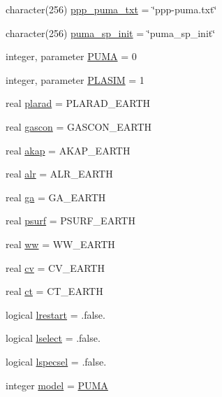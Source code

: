 \begin{DoxyCompactItemize}
\item 
character(256) \hyperlink{classpumamod_ae6491cb06d104f50f9803d15f195f951}{ppp\-\_\-puma\-\_\-txt} = \char`\"{}ppp-\/puma.\-txt\char`\"{}
\item 
character(256) \hyperlink{classpumamod_a97179af6f9ebee802a4333f951b0f436}{puma\-\_\-sp\-\_\-init} = \char`\"{}puma\-\_\-sp\-\_\-init\char`\"{}
\item 
integer, parameter \hyperlink{classpumamod_a6cfe02b5d7dfcb7850792dcc03ae3a45}{\-P\-U\-M\-A} = 0
\item 
integer, parameter \hyperlink{classpumamod_a6014a04a0c8a568ae850cff922ec8c36}{\-P\-L\-A\-S\-I\-M} = 1
\item 
real \hyperlink{classpumamod_a0c307462fbf87e3081b2a385e18d2aed}{plarad} = \-P\-L\-A\-R\-A\-D\-\_\-\-E\-A\-R\-T\-H
\item 
real \hyperlink{classpumamod_ae3f731196cc45fe58378593cedcbb674}{gascon} = \-G\-A\-S\-C\-O\-N\-\_\-\-E\-A\-R\-T\-H
\item 
real \hyperlink{classpumamod_a3d53197ec6d14527904d37910baf20ba}{akap} = \-A\-K\-A\-P\-\_\-\-E\-A\-R\-T\-H
\item 
real \hyperlink{classpumamod_a16fd3c35a535517745304e4e978dad36}{alr} = \-A\-L\-R\-\_\-\-E\-A\-R\-T\-H
\item 
real \hyperlink{classpumamod_afab1546c76a48d45df0296c921674b29}{ga} = \-G\-A\-\_\-\-E\-A\-R\-T\-H
\item 
real \hyperlink{classpumamod_aecc1e882fcb2823bd6f2bc1448c1953d}{psurf} = \-P\-S\-U\-R\-F\-\_\-\-E\-A\-R\-T\-H
\item 
real \hyperlink{classpumamod_ac1247b3015d439d0c9f1b6b7ff94722b}{ww} = \-W\-W\-\_\-\-E\-A\-R\-T\-H
\item 
real \hyperlink{classpumamod_a565ac5e5bafeaa6e81c64ce72e63ccf1}{cv} = \-C\-V\-\_\-\-E\-A\-R\-T\-H
\item 
real \hyperlink{classpumamod_a7a6d067e0dfb359595d82114a0362ff2}{ct} = \-C\-T\-\_\-\-E\-A\-R\-T\-H
\item 
logical \hyperlink{classpumamod_ac3cfb3fcdded6ec157594b899e3ea6f8}{lrestart} = .false.
\item 
logical \hyperlink{classpumamod_aea52fae2a0b29f7669124cb727b07a5f}{lselect} = .false.
\item 
logical \hyperlink{classpumamod_ae1611527d39b509b932ec189dd6885c3}{lspecsel} = .false.
\item 
integer \hyperlink{classpumamod_a7b22b37e933bb9e2b91022f17891b322}{model} = \hyperlink{classpumamod_a6cfe02b5d7dfcb7850792dcc03ae3a45}{\-P\-U\-M\-A}

\end{DoxyCompactItemize}
